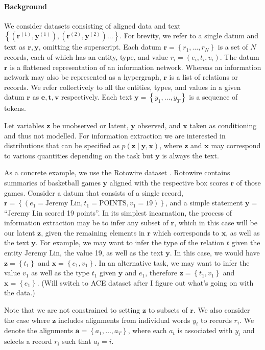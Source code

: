 \documentclass[11pt]{article}
\newcommand\set[1]{\left\{#1\right\}}
\newcommand{\ba}{\mathbf{a}}
\newcommand{\be}{\mathbf{e}}
\newcommand{\br}{\mathbf{r}}
\newcommand{\bt}{\mathbf{t}}
\newcommand{\bv}{\mathbf{v}}
\newcommand{\bx}{\mathbf{x}}
\newcommand{\by}{\mathbf{y}}
\newcommand{\bz}{\mathbf{z}}
\begin{document}
\paragraph{Background}
We consider datasets consisting of aligned data and text
$\set{(\br^{(1)}, \by^{(1)}),(\br^{(2)},\by^{(2)})\ldots}$.
For brevity, we refer to a single datum and text as $\br,\by$, omitting the superscript.
Each datum $\br = \set{r_1,\ldots,r_N}$ is a set of $N$ records, each of which has
an entity, type, and value $r_i = (e_i, t_i, v_i)$.
The datum $\br$ is a flattened representation of an information network.
Whereas an information network may also be represented as a hypergraph,
$\br$ is a list of relations or records.
We refer collectively to all the entities, types, and values in a given datum $\br$ as
$\be,\bt,\bv$ respectively.
Each text $\by = \set{y_1,\ldots,y_T}$ is a sequence of tokens.

Let variables $\bz$ be unobserved or latent, $\by$ observed, and $\bx$ taken as conditioning
and thus not modelled.
For information extraction we are interested in distributions that can be specified as $p(\bz\mid\by,\bx)$,
where $\bz$ and $\bx$ may correspond to various quantities depending on the task
but $\by$ is always the text.

As a concrete example, we use the Rotowire dataset \citep{wiseman2017d2t}.
Rotowire contains summaries of basketball games $\by$ aligned with the respective
box scores $\br$ of those games.
Consider a datum that consists of a single record,
$\br = \set{(e_1 = \textrm{Jeremy Lin}, t_1 = \textrm{POINTS}, v_1 = 19)}$,
and a simple statement $\by = $``Jeremy Lin scored 19 points''.
In its simplest incarnation, the process of information extraction may be to infer any
subset of $\br$, which in this case will be our latent $\bz$, given the remaining elements in $\br$
which corresponds to $\bx$, as well as the text $\by$.
For example, we may want to infer the type of the relation $t$ given 
the entity Jeremy Lin, the value 19, as well as the text $\by$.
In this case, we would have $\bz = \set{t_1}$ and $\bx = \set{e_1,v_1}$.
In an alternative task, we may want to infer the value $v_1$ 
as well as the type $t_1$ given $\by$ and $e_1$, therefore $\bz = \set{t_1,v_1}$ and $\bx=\set{e_1}$.
(Will switch to ACE dataset after I figure out what's going on with the data.)

Note that we are not constrained to setting $\bz$ to subsets of $\br$.
We also consider the case where $\bz$ includes alignments from individual words $y_t$
to records $r_i$. We denote the alignments $\ba = \set{a_1,\ldots,a_T}$,
where each $a_t$ is associated with $y_t$ and selects a record $r_i$ such that $a_t = i$.
\end{document}
